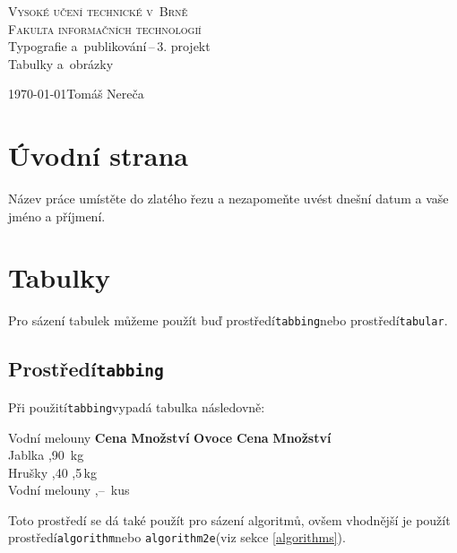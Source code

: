 \documentclass[a4paper, 11pt]{article}
\begin{document}
\begin{titlepage}
\begin{center}
\textsc{\Huge Vysoké učení technické v~Brně\\
		\huge Fakulta informačních technologií\\}
{\LARGE Typografie a~publikování\,--\,3. projekt\\}
\Huge Tabulky a~obrázky\\
\end{center}
{\Large \today \hfill Tomáš Nereča}
\end{titlepage}

\section{Úvodní strana}
Název práce umístěte do zlatého řezu a nezapomeňte uvést dnešní datum a vaše jméno a příjmení.

\section{Tabulky}
Pro sázení tabulek můžeme použít buď prostředí\hspace{0.6em}\texttt{tabbing}\hspace{0.6em}nebo prostředí\hspace{0.6em}\texttt{tabular}.

\subsection{Prostředí\hspace{0.6em}\texttt{tabbing}}
Při použití\hspace{0.6em}\texttt{tabbing}\hspace{0.6em}vypadá tabulka následovně:
\begin{tabbing}
Vodní melouny \quad \= \textbf{Cena} \quad \= \textbf{Množství} \kill
\textbf{Ovoce} \> \textbf{Cena} \> \textbf{Množství}\\
Jablka ,90 \,kg\\
Hrušky ,40 ,5\,kg\\
Vodní melouny ,-- \,kus
\end{tabbing}\bigskip
Toto prostředí se dá také použít pro sázení algoritmů, ovšem vhodnější je použít prostředí\hspace{0.6em}\texttt{algorithm}\hspace{0.6em}nebo\hspace{0.6em}
\texttt{algorithm2e}\hspace{0.6em}(viz sekce \ref{algorithms}).
\end{document}
